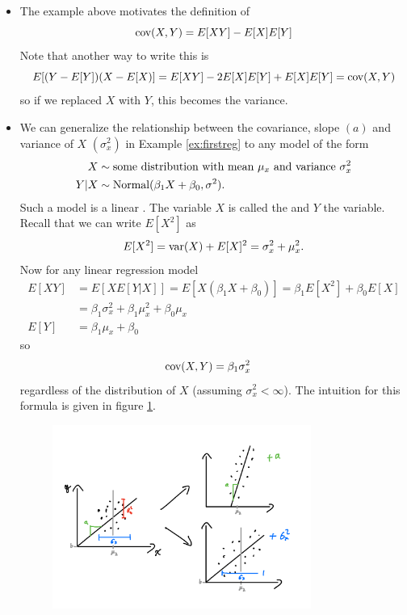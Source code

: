 \begin{itemize}
\item The example above motivates the definition of 
\begin{equation}
{\rm cov}(X,Y) = E[XY]-E[X]E[Y]
\end{equation}
Note that another way to write this is 
\begin{equation*}
 E[(Y-E[Y])(X-E[X)] = E[XY] - 2E[X]E[Y]+E[X]E[Y] = {\rm cov}(X,Y)
\end{equation*}
so if we replaced $X$ with $Y$, this becomes the variance. 
\item We can generalize the relationship between the covariance, slope $(a)$ and variance of $X$ $(\sigma_x^2)$ in Example \ref{ex:firstreg} to any model of the form 
\begin{align}
\begin{split}\label{eq:linreg}
X &\sim \text{some distribution with mean $\mu_x$ and variance $\sigma_x^2$}\\
Y|X &\sim {\rm Normal}(\beta_1X + \beta_0,\sigma^2). 
\end{split}
\end{align}
Such a model is a linear . The variable $X$ is called the  and $Y$ the  variable. 
Recall that we can write $E[X^2]$ as
\begin{equation*}
E[X^2] ={\rm var}(X) + E[X]^2 =  \sigma_x^2 + \mu_x^2. 
\end{equation*}
Now for any linear regression model
\begin{align*}
E[XY] &= E[XE[Y|X]] = E[X(\beta_1 X+\beta_0)] = \beta_1E[X^2] + \beta_0 E[X] \\
&= \beta_1\sigma_x^2 +\beta_1 \mu_x^2 +\beta_0 \mu_x\\
E[Y] &= \beta_1\mu_x +\beta_0
\end{align*}
so 
\begin{align*}
{\rm cov}(X,Y) &= \beta_1\sigma_x^2
\end{align*}
regardless of the distribution of $X$ (assuming $\sigma_x^2 <\infty$). The intuition for this formula is given in figure \ref{fig:cov_effect}. 


\begin{figure}[h]
\centering
\includegraphics[width=0.8\textwidth]{./../figures/cov_effect}
\caption{}\label{fig:cov_effect}
\end{figure}





\end{itemize}
